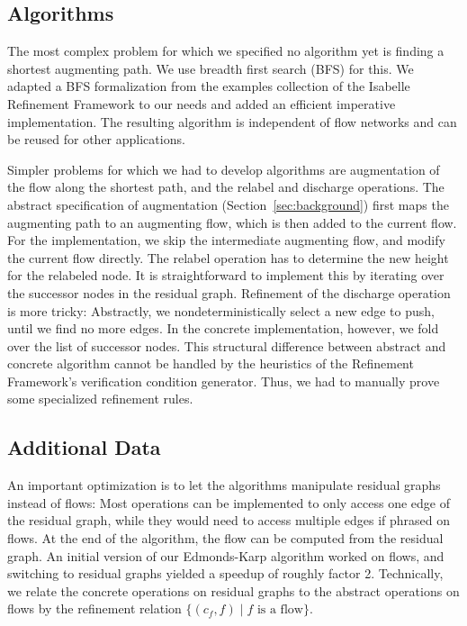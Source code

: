 \documentclass[smallcondensed]{svjour3}     %
\begin{document}
  \subsection{Algorithms}
  The most complex problem for which we specified no algorithm yet is finding a shortest augmenting path.
  We use breadth first search (BFS) for this. We adapted a BFS formalization from the examples collection of the Isabelle Refinement Framework to
  our needs and added an efficient imperative implementation. The resulting algorithm 
  is independent of flow networks and can be reused for other applications.
  
  Simpler problems for which we had to develop algorithms are augmentation of the flow along the shortest path, and the relabel and discharge operations.
  The abstract specification of augmentation (\cf Section~\ref{sec:background}) first maps the augmenting path to an augmenting flow, which is then added 
  to the current flow. For the implementation, we skip the intermediate augmenting flow, and modify the current flow directly.
  The relabel operation has to determine the new height for the relabeled node. It is straightforward to implement this by iterating over the 
  successor nodes in the residual graph. Refinement of the discharge operation is more tricky: Abstractly, we nondeterministically select a new edge to push, 
  until we find no more edges.
  In the concrete implementation, however, we fold over the list of successor nodes.
  This structural difference between abstract and concrete algorithm cannot be handled by the heuristics of the Refinement Framework's verification condition generator.
  Thus, we had to manually prove some specialized refinement rules.
  
  \subsection{Additional Data}\label{sec:impl_add_data}
  An important optimization is to let the algorithms manipulate residual graphs instead of flows: 
  Most operations can be implemented to only access one edge of the residual graph, while they would 
  need to access multiple edges if phrased on flows. At the end of the algorithm, the flow can be 
  computed from the residual graph. 
  An initial version of our Edmonds-Karp algorithm worked on flows, and switching to residual graphs yielded a speedup of roughly factor 2.
  Technically, we relate the concrete operations on residual graphs to the abstract operations on flows by the refinement 
  relation $\{(c_f,f) \mid \text{$f$ is a flow}\}$.
\end{document}
